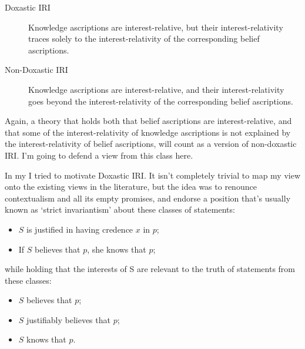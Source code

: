 \begin{description}
\item[Doxastic IRI] Knowledge ascriptions are interest-relative, but their interest-rela\-tivity traces solely to the interest-relativity of the corresponding belief ascriptions.
\item[Non-Doxastic IRI] Knowledge ascriptions are interest-relative, and their inter\-est-relativity goes beyond the interest-relativity of the corresponding belief ascriptions.
\end{description}

\noindent Again, a theory that holds both that belief ascriptions are interest-relative, and that some of the interest-relativity of knowledge ascriptions is not explained by the interest-relativity of belief ascriptions, will count as a version of non-doxastic IRI. I'm going to defend a view from this class here.

In my \citet{Weatherson2005-WEACWD} I tried to motivate Doxastic IRI. It isn't completely trivial to map my view onto the existing views in the literature, but the idea was to renounce contextualism and all its empty promises, and endorse a position that's usually known as `strict invariantism' about these classes of statements:
\begin{itemize}
\item $S$ is justified in having credence $x$ in $p$;
\item	If $S$ believes that $p$, she knows that $p$;
\end{itemize}
\noindent while holding that the interests of S are relevant to the truth of statements from these classes:
\begin{itemize}
\item $S$ believes that $p$;
\item $S$ justifiably believes that $p$;
\item $S$ knows that $p$.
\end{itemize}


